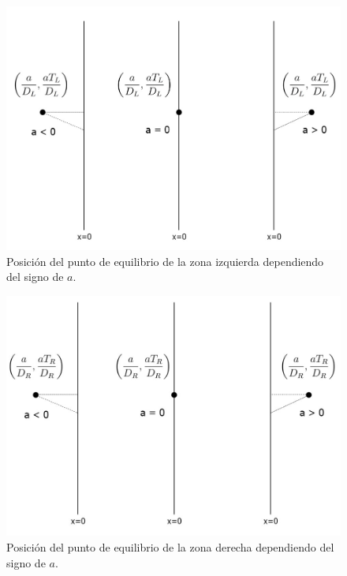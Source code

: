 \documentclass[12pt,a4paper]{report} %
\begin{document}
		\vspace{1cm}
		
		\begin{figure}[h]
			\centering
			\includegraphics[width=1\textwidth]{punto.jpg}
			\caption{Posición del punto de equilibrio de la zona izquierda dependiendo del signo de $a$.}
			\label{fig:punto}	
			\centering
		\end{figure}\smallskip
		
		\newpage
		
		\begin{figure}[h]
			\includegraphics[width=1\textwidth]{puntoR.jpg}
			\caption{Posición del punto de equilibrio de la zona derecha dependiendo del signo de $a$.}
			\label{fig:puntoR}
		\end{figure}\smallskip
		
\end{document}
